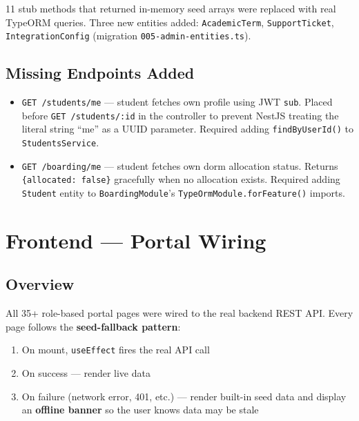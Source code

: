 \documentclass[11pt, a4paper]{article}
\newcommand{\code}[1]{\texttt{\small #1}}
\begin{document}
11 stub methods that returned in-memory seed arrays were replaced with real
TypeORM queries. Three new entities added: \code{AcademicTerm},
\code{SupportTicket}, \code{IntegrationConfig} (migration \code{005-admin-entities.ts}).

\subsection{Missing Endpoints Added}

\begin{itemize}[leftmargin=1.5em, itemsep=2pt]
  \item \code{GET /students/me} --- student fetches own profile using JWT \code{sub}.
    Placed before \code{GET /students/:id} in the controller to prevent NestJS
    treating the literal string ``me'' as a UUID parameter.
    Required adding \code{findByUserId()} to \code{StudentsService}.

  \item \code{GET /boarding/me} --- student fetches own dorm allocation status.
    Returns \code{\{allocated: false\}} gracefully when no allocation exists.
    Required adding \code{Student} entity to \code{BoardingModule}'s
    \code{TypeOrmModule.forFeature()} imports.
\end{itemize}

\section{Frontend --- Portal Wiring}

\subsection{Overview}

All 35+ role-based portal pages were wired to the real backend REST API.
Every page follows the \textbf{seed-fallback pattern}:

\begin{enumerate}[leftmargin=1.5em, itemsep=0pt]
  \item On mount, \code{useEffect} fires the real API call
  \item On success --- render live data
  \item On failure (network error, 401, etc.) --- render built-in seed data
    and display an \textbf{offline banner} so the user knows data may be stale
\end{enumerate}
\end{document}
